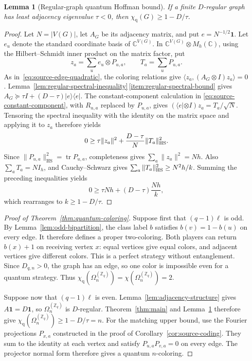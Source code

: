 \documentclass[11pt,a4paper]{article}
\numberwithin{equation}{section}
\numberwithin{figure}{section}
\numberwithin{table}{section}
\numberwithin{footnote}{section}
\newtheorem{lemma}[theorem]{Lemma}
\theoremstyle{informal}\newtheorem*{informaltheorem}{Informal theorem}
\theoremstyle{definition}\newtheorem{example}{Example}[section]
\theoremstyle{remark}\newtheorem{remark}[theorem]{Remark}
\newcommand{\Z}{\mathbb Z}
\newcommand{\C}{\mathbb C}
\newcommand{\one}{\mathbf 1}
\newcommand{\chq}{\chi_{\mathrm q}}
\newcommand{\Om}{\Omega_n^{(\Z_q)}}
\newcommand{\tr}{\operatorname{tr}}
\newcommand{\HS}{\mathrm{HS}}
\begin{document}
\begin{lemma}[Regular-graph quantum Hoffman bound]\label{lem:hoffman}
If a finite \(D\)-regular graph has least adjacency eigenvalue
\(\tau<0\), then \(\chq(G)\geq1-D/\tau\).
\end{lemma}
\begin{proof}
Let \(N=|V(G)|\), let \(A_G\) be its adjacency matrix, and put
\(e=N^{-1/2}\one\). Let \(e_u\) denote the standard coordinate basis
of \(\C^{V(G)}\).
In \(\C^{V(G)}\otimes M_h(\C)\), using the Hilbert--Schmidt inner
product on the matrix factor, put
\begin{equation}
 z_a=\sum_u e_u\otimes P_{u,a},\qquad T_a=\sum_uP_{u,a}.
\end{equation}
As in~\eqref{eq:source-edge-quadratic}, the coloring relations give
\(\langle z_a,(A_G\otimes I)z_a\rangle=0\).
Lemma~\ref{lem:regular-spectral-inequality}\,\ref{item:regular-spectral-bound}
gives
\(A_G\succeq\tau I+(D-\tau)|e\rangle\langle e|\).
The constant-component calculation in
\eqref{eq:source-constant-component}, with \(R_{u,a}\) replaced by
\(P_{u,a}\), gives \((\langle e|\otimes I)z_a=T_a/\sqrt N\).
Tensoring the spectral inequality with the identity on the matrix
space and applying it to \(z_a\) therefore yields
\begin{equation}
 0\geq\tau\|z_a\|^2+\frac{D-\tau}{N}\|T_a\|_{\rm HS}^2.
\end{equation}
Since \(\|P_{u,a}\|_{\HS}^2=\tr P_{u,a}\), completeness gives
\(\sum_a\|z_a\|^2=Nh\). Also \(\sum_aT_a=NI_h\), and
Cauchy--Schwarz gives \(\sum_a\|T_a\|_{\rm HS}^2\geq N^2h/k\).
Summing the preceding inequalities yields
\begin{equation}
 0\geq\tau Nh+(D-\tau)\frac{Nh}{k},
\end{equation}
which rearranges to \(k\geq1-D/\tau\).
\end{proof}

\begin{proof}[Proof of Theorem~\ref{thm:quantum-coloring}]
Suppose first that \((q-1)\ell\) is odd. By
Lemma~\ref{lem:odd-bipartition}, the class label \(b\) satisfies
\(b(v)=1-b(u)\) on every edge.
It therefore defines a proper two-coloring. Both players can return
\(b(x)+1\) on receiving vertex \(x\): equal vertices give equal
colors, and adjacent vertices give different colors. This is a
perfect strategy without entanglement. Since \(D_{q,n}>0\), the
graph has an edge, so one color is impossible even for a quantum
strategy. Thus \(\chq(\Om)=\chi(\Om)=2\).

Suppose now that \((q-1)\ell\) is even.
Lemma~\ref{lem:adjacency-structure} gives \(A\one=D\one\), so
\(\Om\) is \(D\)-regular. Theorem~\ref{thm:main} and
Lemma~\ref{lem:hoffman} therefore give
\(\chq(\Om)\geq1-D/\tau=n\).
For the matching upper bound, use the Fourier projections
\(P_{x,a}\) constructed in the proof of
Corollary~\ref{cor:source-coding}. They sum to the identity at each
vertex and satisfy \(P_{u,a}P_{v,a}=0\) on every edge. The projector
normal form therefore gives a quantum \(n\)-coloring.
\end{proof}
\end{document}

